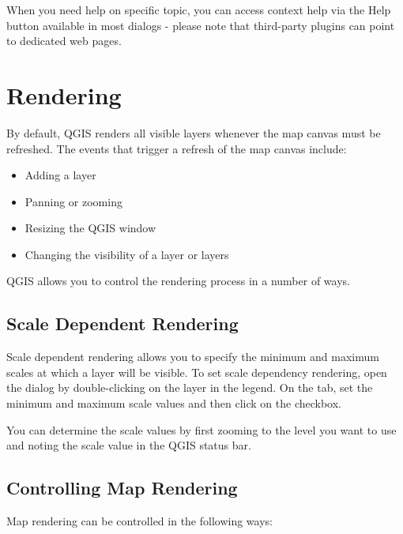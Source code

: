 When you need help on specific topic, you can access context help via the Help
button available in most dialogs - please note that third-party plugins can point to
dedicated web pages.

\section{Rendering}\label{subsec:redraw_events}

By default, QGIS renders all visible layers whenever the map canvas must be
refreshed. The events that trigger a refresh of the map canvas include:

\begin{itemize}
\item Adding a layer
\item Panning or zooming
\item Resizing the QGIS window
\item Changing the visibility of a layer or layers
\end{itemize}

QGIS allows you to control the rendering process in a number of ways.

\subsection{Scale Dependent Rendering}
\label{label_scaledepend}

Scale dependent rendering allows you to specify the minimum and maximum
scales at which a layer will be visible.  To set scale dependency rendering,
open the  dialog by double-clicking on the layer in the
legend. On the  tab, set the minimum and maximum scale values and then
click on the  checkbox.

You can determine the scale values by first zooming to the level you want
to use and noting the scale value in the QGIS status bar.

\subsection{Controlling Map Rendering}\label{label_controlmap}

Map rendering can be controlled in the following ways:

\label{label_suspendrender}

